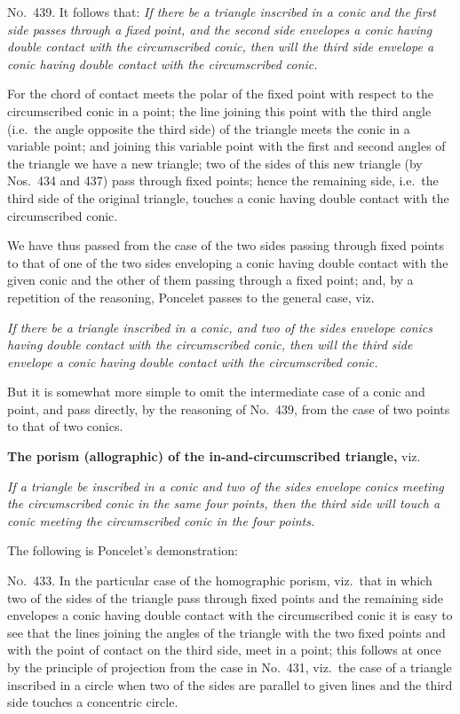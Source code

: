 \documentclass[12pt,a4paper]{article}
\theoremstyle{plain}
\theoremstyle{definition}
\begin{document}
\textsc{No.~439.} It follows that: \textit{If there be a triangle inscribed in a conic and the first side passes through a fixed point, and the second side envelopes a conic having double contact with the circumscribed conic, then will the third side envelope a conic having double contact with the circumscribed conic.}

For the chord of contact meets the polar of the fixed point with respect to the circumscribed conic in a point; the line joining this point with the third angle (i.e.\ the angle opposite the third side) of the triangle meets the conic in a variable point; and joining this variable point with the first and second angles of the triangle we have a new triangle; two of the sides of this new triangle (by Nos.~434 and 437) pass through fixed points; hence the remaining side, i.e.\ the third side of the original triangle, touches a conic having double contact with the circumscribed conic.

We have thus passed from the case of the two sides passing through fixed points to that of one of the two sides enveloping a conic having double contact with the given conic and the other of them passing through a fixed point; and, by a repetition of the reasoning, Poncelet passes to the general case, viz.

\textit{If there be a triangle inscribed in a conic, and two of the sides envelope conics having double contact with the circumscribed conic, then will the third side envelope a conic having double contact with the circumscribed conic.}

But it is somewhat more simple to omit the intermediate case of a conic and point, and pass directly, by the reasoning of No.~439, from the case of two points to that of two conics.

\newpage
\textbf{The porism (allographic) of the in-and-circumscribed triangle,} viz.

\textit{If a triangle be inscribed in a conic and two of the sides envelope conics meeting the circumscribed conic in the same four points, then the third side will touch a conic meeting the circumscribed conic in the four points.}

The following is Poncelet's demonstration:

\textsc{No.~433.} In the particular case of the homographic porism, viz.\ that in which two of the sides of the triangle pass through fixed points and the remaining side envelopes a conic having double contact with the circumscribed conic it is easy to see that the lines joining the angles of the triangle with the two fixed points and with the point of contact on the third side, meet in a point; this follows at once by the principle of projection from the case in No.~431, viz.\ the case of a triangle inscribed in a circle when two of the sides are parallel to given lines and the third side touches a concentric circle.
\end{document}
